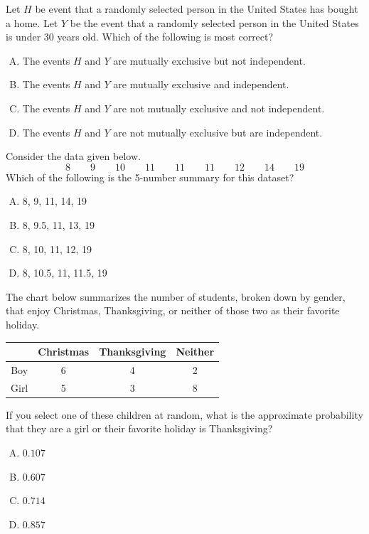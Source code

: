 \documentclass[12pt,letterpaper]{exam}
\begin{document}
\begin{questions}
\vfill

\question Let $H$ be event that a randomly selected person in the United States has bought a home. Let $Y$ be the event that a randomly selected person in the United States is under 30 years old. Which of the following is most correct?
	\begin{enumerate}[A.]
	\item The events $H$ and $Y$ are mutually exclusive but not independent. 
	\item The events $H$ and $Y$ are mutually exclusive and independent. 
	\item The events $H$ and $Y$ are not mutually exclusive and not independent. 
	\item The events $H$ and $Y$ are not mutually exclusive but are independent. 
	\end{enumerate}

\vfill

\question Consider the data given below.
	\[
	8 \qquad 9 \qquad 10 \qquad 11 \qquad 11 \qquad 11 \qquad 12 \qquad 14 \qquad 19
	\]
Which of the following is the 5-number summary for this dataset?
	\begin{enumerate}[A.]
	\item 8, 9, 11, 14, 19
	\item 8, 9.5, 11, 13, 19
	\item 8, 10, 11, 12, 19
	\item 8, 10.5, 11, 11.5, 19
	\end{enumerate}

\vfill

\question The chart below summarizes the number of students, broken down by gender, that enjoy Christmas, Thanksgiving, or neither of those two as their favorite holiday. \par
	\begin{table}[H]
	\centering
	\begin{tabular}{|c|c|c|c|} \hline
	& Christmas & Thanksgiving & Neither \\ \hline
	Boy & 6 & 4 & 2 \\ \hline
	Girl & 5 & 3 & 8 \\ \hline
	\end{tabular}
	\end{table} \par
If you select one of these children at random, what is the approximate probability that they are a girl or their favorite holiday is Thanksgiving?
	\begin{enumerate}[A.]
	\item $0.107$
	\item $0.607$
	\item $0.714$
	\item $0.857$
	\end{enumerate}


\end{questions}
\end{document}
